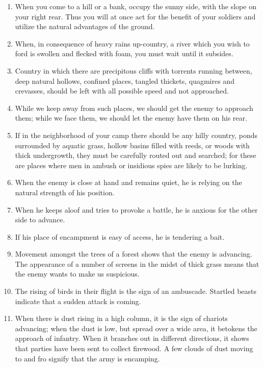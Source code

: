 \begin{enumerate}
  \item When you come to a hill or a bank, occupy the sunny side, with
    the slope on your right rear. Thus you will at once act for the
    benefit of your soldiers and utilize the natural advantages of the
    ground.

  \item When, in consequence of heavy rains up-country, a river which
    you wish to ford is swollen and flecked with foam, you must wait
    until it subsides.

  \item Country in which there are precipitous cliffs with torrents
    running between, deep natural hollows, confined places, tangled
    thickets, quagmires and crevasses, should be left with all
    possible speed and not approached.

  \item While we keep away from such places, we should get the enemy
    to approach them; while we face them, we should let the enemy have
    them on his rear.

  \item If in the neighborhood of your camp there should be any hilly
    country, ponds surrounded by aquatic grass, hollow basins filled
    with reeds, or woods with thick undergrowth, they must be
    carefully routed out and searched; for these are places where men
    in ambush or insidious spies are likely to be lurking.

  \item When the enemy is close at hand and remains quiet, he is
    relying on the natural strength of his position.

  \item When he keeps aloof and tries to provoke a battle, he is
    anxious for the other side to advance.

  \item If his place of encampment is easy of access, he is tendering
    a bait.

  \item Movement amongst the trees of a forest shows that the enemy is
    advancing. The appearance of a number of screens in the midst of
    thick grass means that the enemy wants to make us suspicious.

  \item The rising of birds in their flight is the sign of an
    ambuscade. Startled beasts indicate that a sudden attack is
    coming.

  \item When there is dust rising in a high column, it is the sign of
    chariots advancing; when the dust is low, but spread over a wide
    area, it betokens the approach of infantry. When it branches out
    in different directions, it shows that parties have been sent to
    collect firewood. A few clouds of dust moving to and fro signify
    that the army is encamping.


\end{enumerate}
